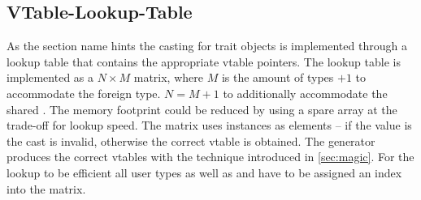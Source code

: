 \documentclass[thesis]{subfiles}
\begin{document}
  \subsection{VTable-Lookup-Table}
    As the section name hints the casting for trait objects is implemented through a lookup table that contains the appropriate vtable pointers.
    The lookup table is implemented as a $N \times M$ matrix, where $M$ is the amount of types $+1$ to accommodate the foreign type.
    $N=M+1$ to additionally accommodate the shared \trait \SkillObject.
    The memory footprint could be reduced by using a spare array at the trade-off for lookup speed.
    The matrix uses  instances as elements -- if the value is  the cast is invalid, otherwise the correct vtable is obtained.
    The generator produces the correct vtables with the technique introduced in \autoref{sec:magic}.
    For the lookup to be efficient all user types as well as  and \SkillObject have to be assigned an index into the matrix.
\end{document}
